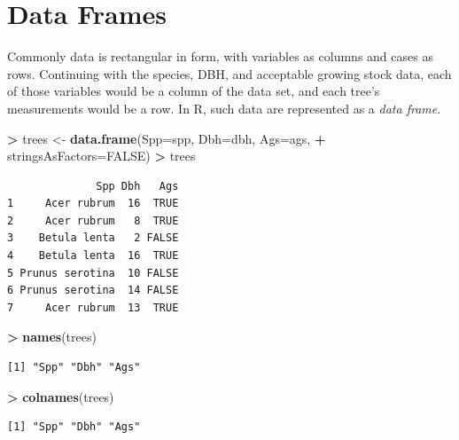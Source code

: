 \documentclass[]{krantz}
\makeatletter
\newenvironment{Shaded}{\begin{snugshade}}{\end{snugshade}}
\newcommand{\DataTypeTok}[1]{\textcolor[rgb]{0.27,0.27,0.27}{#1}}
\newcommand{\KeywordTok}[1]{\textcolor[rgb]{0.27,0.27,0.27}{\textbf{#1}}}
\newcommand{\NormalTok}[1]{#1}
\newcommand{\OperatorTok}[1]{\textcolor[rgb]{0.43,0.43,0.43}{\textbf{#1}}}
\newcommand{\OtherTok}[1]{\textcolor[rgb]{0.37,0.37,0.37}{#1}}
\newcommand{\StringTok}[1]{\textcolor[rgb]{0.5,0.5,0.5}{#1}}
\newenvironment{kframe}{%
\medskip{}
\setlength{\fboxsep}{.8em}
 \def\at@end@of@kframe{}%
 \ifinner\ifhmode%
  \def\at@end@of@kframe{\end{minipage}}%
  \begin{minipage}{\columnwidth}%
 \fi\fi%
 \def\FrameCommand##1{\hskip\@totalleftmargin \hskip-\fboxsep
 \colorbox{shadecolor}{##1}\hskip-\fboxsep
     \hskip-\linewidth \hskip-\@totalleftmargin \hskip\columnwidth}%
 \MakeFramed {\advance\hsize-\width
   \@totalleftmargin\z@ \linewidth\hsize
   \@setminipage}}%
 {\par\unskip\endMakeFramed%
 \at@end@of@kframe}
\renewenvironment{Shaded}{\begin{kframe}}{\end{kframe}}
\makeatother
\begin{document}
\hypertarget{data-frames}{%
\section{Data Frames}\label{data-frames}}

Commonly data is rectangular in form, with variables as columns and cases as rows. Continuing with the species, DBH, and acceptable growing stock data, each of those variables would be a column of the data set, and each tree's measurements would be a row. In R, such data are represented as a \emph{data frame}.

\begin{Shaded}
\begin{Highlighting}[]
\OperatorTok{>}\StringTok{ }\NormalTok{trees <-}\StringTok{ }\KeywordTok{data.frame}\NormalTok{(}\DataTypeTok{Spp=}\NormalTok{spp, }\DataTypeTok{Dbh=}\NormalTok{dbh, }\DataTypeTok{Ags=}\NormalTok{ags, }
\OperatorTok{+}\StringTok{                     }\DataTypeTok{stringsAsFactors=}\OtherTok{FALSE}\NormalTok{)}
\OperatorTok{>}\StringTok{ }\NormalTok{trees}
\end{Highlighting}
\end{Shaded}

\begin{verbatim}
              Spp Dbh   Ags
1     Acer rubrum  16  TRUE
2     Acer rubrum   8  TRUE
3    Betula lenta   2 FALSE
4    Betula lenta  16  TRUE
5 Prunus serotina  10 FALSE
6 Prunus serotina  14 FALSE
7     Acer rubrum  13  TRUE
\end{verbatim}

\begin{Shaded}
\begin{Highlighting}[]
\OperatorTok{>}\StringTok{ }\KeywordTok{names}\NormalTok{(trees)}
\end{Highlighting}
\end{Shaded}

\begin{verbatim}
[1] "Spp" "Dbh" "Ags"
\end{verbatim}

\begin{Shaded}
\begin{Highlighting}[]
\OperatorTok{>}\StringTok{ }\KeywordTok{colnames}\NormalTok{(trees)}
\end{Highlighting}
\end{Shaded}

\begin{verbatim}
[1] "Spp" "Dbh" "Ags"
\end{verbatim}
\end{document}
